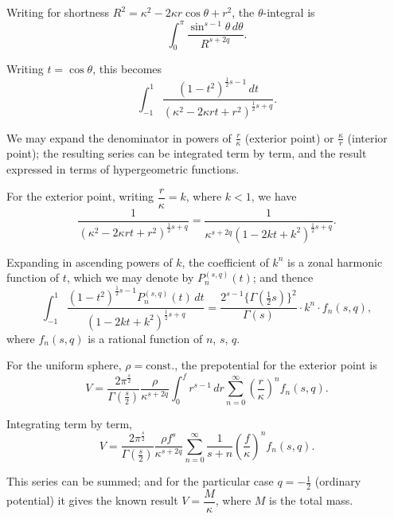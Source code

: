 \documentclass[11pt,a4paper]{book}
\begin{document}
\begin{art}\label{art:65}
Writing for shortness $R^2 = \kappa^2 - 2\kappa r\cos\theta + r^2$, the $\theta$-integral is
\[
\int_0^\pi \frac{\sin^{s-1}\theta \, d\theta}{R^{s+2q}}.
\]

Writing $t = \cos\theta$, this becomes
\[
\int_{-1}^1 \frac{(1-t^2)^{\frac{1}{2}s-1} \, dt}{(\kappa^2 - 2\kappa rt + r^2)^{\frac{1}{2}s+q}}.
\]

We may expand the denominator in powers of $\frac{r}{\kappa}$ (exterior point) or $\frac{\kappa}{r}$ (interior point); the resulting series can be integrated term by term, and the result expressed in terms of hypergeometric functions.
\end{art}

\begin{art}\label{art:66}
For the exterior point, writing $\dfrac{r}{\kappa} = k$, where $k < 1$, we have
\[
\frac{1}{(\kappa^2 - 2\kappa rt + r^2)^{\frac{1}{2}s+q}} = \frac{1}{\kappa^{s+2q}(1 - 2kt + k^2)^{\frac{1}{2}s+q}}.
\]

Expanding in ascending powers of $k$, the coefficient of $k^n$ is a zonal harmonic function of $t$, which we may denote by $P_n^{(s,q)}(t)$; and thence
\[
\int_{-1}^1 \frac{(1-t^2)^{\frac{1}{2}s-1} P_n^{(s,q)}(t) \, dt}{(1-2kt+k^2)^{\frac{1}{2}s+q}} = \frac{2^{s-1}\{\Gamma(\frac{1}{2}s)\}^2}{\Gamma(s)} \cdot k^n \cdot f_n(s,q),
\]
where $f_n(s,q)$ is a rational function of $n$, $s$, $q$.
\end{art}

\begin{art}\label{art:67}
For the uniform sphere, $\rho = \text{const.}$, the prepotential for the exterior point is
\[
V = \frac{2\pi^{\frac{s}{2}}}{\Gamma(\frac{s}{2})} \frac{\rho}{\kappa^{s+2q}} \int_0^f r^{s-1} \, dr \sum_{n=0}^\infty \left(\frac{r}{\kappa}\right)^n f_n(s,q).
\]

Integrating term by term,
\[
V = \frac{2\pi^{\frac{s}{2}}}{\Gamma(\frac{s}{2})} \frac{\rho f^s}{\kappa^{s+2q}} \sum_{n=0}^\infty \frac{1}{s+n} \left(\frac{f}{\kappa}\right)^n f_n(s,q).
\]

This series can be summed; and for the particular case $q = -\tfrac{1}{2}$ (ordinary potential) it gives the known result $V = \dfrac{M}{\kappa}$, where $M$ is the total mass.
\end{art}
\end{document}
